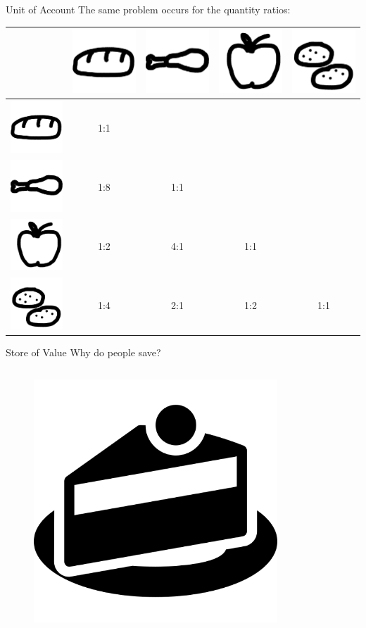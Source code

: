 \documentclass[]{beamer}
\begin{document}
\begin{frame}{Unit of Account}
	The same problem occurs for the quantity ratios:
	\vspace{1em}
	\begin{center}
		\begin{tabular}{l||c|c|c|c}
       			& \includegraphics[height = 0.05\textheight]{../assets/images/bread} & \includegraphics[height = 0.05\textheight]{../assets/images/meat} & \includegraphics[height = 0.05\textheight]{../assets/images/apple} & \includegraphics[height = 0.05\textheight]{../assets/images/potatoes} \\ \hline \hline
			\includegraphics[height = 0.05\textheight]{../assets/images/bread}    & 1:1 & \cellcolor{highlight!50} & \cellcolor{highlight!50} & \cellcolor{highlight!50} \\ \hline
			\includegraphics[height = 0.05\textheight]{../assets/images/meat} &   1:8   & 1:1 & \cellcolor{highlight!50} & \cellcolor{highlight!50} \\ \hline
			\includegraphics[height = 0.05\textheight]{../assets/images/apple}  &   1:2  &    4:1 & 1:1 & \cellcolor{highlight!50} \\ \hline
			\includegraphics[height = 0.05\textheight]{../assets/images/potatoes}    &   1:4  &    2:1  &  1:2    & 1:1     
		\end{tabular}
	\end{center}
	\vspace{1.5em}
\end{frame}

\begin{frame}{Store of Value}
	Why do people save?
	\begin{columns}[T]
		\begin{column}{0.5\textwidth}
			\begin{figure}
				\includegraphics[height = 0.1\textheight]{../assets/images/cake}
			\end{figure}
		\end{column}
		\begin{column}{0.5\textwidth}
			\begin{figure}
			\end{figure}
		\end{column}
	\end{columns}
	
\end{frame}
\end{document}
